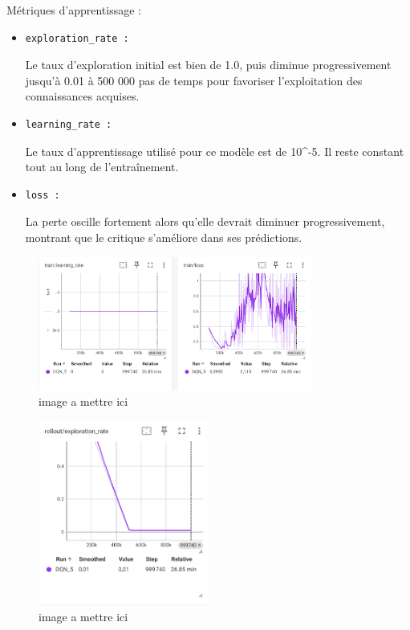 \documentclass{article}
\begin{document}
    Métriques d'apprentissage :
    \begin{itemize} 
        \item \begin{verbatim}exploration_rate :\end{verbatim}Le taux d'exploration initial est bien de 1.0, puis diminue progressivement jusqu'à 0.01 à 500 000 pas de temps pour favoriser l'exploitation des connaissances acquises.
        \item \begin{verbatim}learning_rate :\end{verbatim}Le taux d'apprentissage utilisé pour ce modèle est de 10\^{}-5. Il reste constant tout au long de l'entraînement.
        \item \begin{verbatim}loss :\end{verbatim}La perte oscille fortement alors qu'elle devrait diminuer progressivement, montrant que le critique s'améliore dans ses prédictions.
    \end{itemize}

    \begin{figure}[ht]
        \centering
        \includegraphics[width=0.8\textwidth]{11.png}
        \caption{image a mettre ici}
    \end{figure}

    \clearpage
    
    \begin{figure}[ht]
        \centering
        \includegraphics[width=0.5\textwidth]{12.png}
        \caption{image a mettre ici}
    \end{figure}
\end{document}
